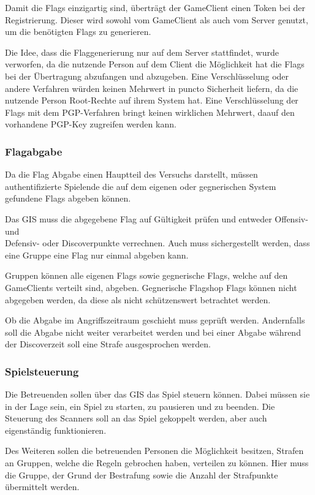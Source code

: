 Damit die Flags einzigartig sind, überträgt der GameClient einen Token bei der Registrierung. Dieser wird sowohl vom GameClient als auch vom Server genutzt, um die benötigten Flags zu generieren.

Die Idee, dass die Flaggenerierung nur auf dem Server stattfindet, wurde verworfen, da die nutzende Person auf dem Client die Möglichkeit hat die Flags bei der Übertragung abzufangen und abzugeben. Eine Verschlüsselung oder andere Verfahren würden keinen Mehrwert in puncto Sicherheit liefern, da die nutzende Person Root-Rechte auf ihrem System hat. Eine Verschlüsselung der Flags mit dem PGP-Verfahren bringt keinen wirklichen Mehrwert, daauf den vorhandene PGP-Key zugreifen werden kann. 

\subsubsection{Flagabgabe}

Da die Flag Abgabe einen Hauptteil des Versuchs darstellt, müssen authentifizierte Spielende die auf dem eigenen oder gegnerischen System gefundene Flags abgeben können.

Das GIS muss die abgegebene Flag auf Gültigkeit prüfen und entweder Offensiv- und \\
Defensiv- oder Discoverpunkte verrechnen. Auch muss sichergestellt werden, dass eine Gruppe eine Flag nur einmal abgeben kann.

Gruppen können alle eigenen Flags sowie gegnerische Flags, welche auf den GameClients verteilt sind, abgeben. Gegnerische Flagshop Flags können nicht abgegeben werden, da diese als nicht schützenswert betrachtet werden.

Ob die Abgabe im Angriffszeitraum geschieht muss geprüft werden. Andernfalls soll die Abgabe nicht weiter verarbeitet werden und bei einer Abgabe während der Discoverzeit soll eine Strafe ausgesprochen werden.


\subsubsection{Spielsteuerung}

Die Betreuenden sollen über das GIS das Spiel steuern können. Dabei müssen sie in der Lage sein, ein Spiel zu starten, zu pausieren und zu beenden. Die Steuerung des Scanners soll an das Spiel gekoppelt werden, aber auch eigenständig funktionieren.

Des Weiteren sollen die betreuenden Personen die Möglichkeit besitzen, Strafen an Gruppen, welche die Regeln gebrochen haben, verteilen zu können. Hier muss die Gruppe, der Grund der Bestrafung sowie die Anzahl der Strafpunkte übermittelt werden.

